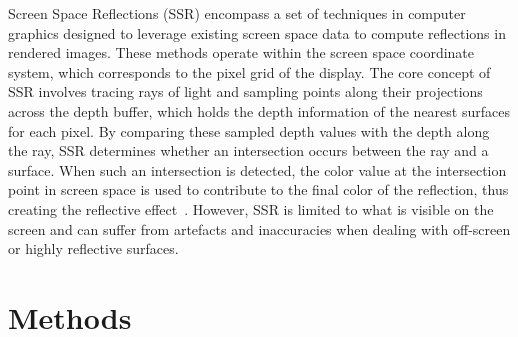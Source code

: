 Screen Space Reflections (SSR) encompass a set of techniques in computer graphics designed to leverage existing screen space data to compute reflections in rendered images.
These methods operate within the screen space coordinate system, which corresponds to the pixel grid of the display. The core concept of SSR involves tracing rays of light and sampling points along their projections across the depth buffer,
which holds the depth information of the nearest surfaces for each pixel. By comparing these sampled depth values with the depth along the ray, SSR determines whether an intersection occurs between the ray and a surface.
When such an intersection is detected, the color value at the intersection point in screen space is used to contribute to the final color of the reflection, thus creating the reflective effect~\cite{beug2020screen}.
However, SSR is limited to what is visible on the screen and can suffer from artefacts and inaccuracies when dealing with off-screen or highly reflective surfaces.




\section{Methods}

